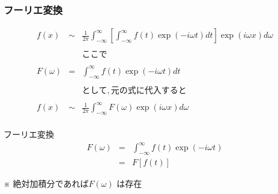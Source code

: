 \documentclass[a4paper]{jsarticle}
\begin{document}
\subsubsection{フーリエ変換}
\begin{eqnarray*}
    f\left(x\right) &\sim& \frac{1}{2\pi}\int^{\infty}_{-\infty}\left[\int^{\infty}_{-\infty}f\left(t\right)\exp \left(-i \omega t\right)dt\right] \exp \left(i\omega x\right) d\omega\\
    \\
    &&ここで\\
    \\
    F\left(\omega\right) &=& \int^{\infty}_{-\infty}f\left(t\right)\exp \left(-i \omega t\right)dt \\
    \\
    &&として,元の式に代入すると\\
    \\
    f\left(x\right) &\sim& \frac{1}{2\pi}\int^{\infty}_{-\infty} F\left(\omega\right) \exp \left(i\omega x\right) d\omega\\
\end{eqnarray*}
\begin{itembox}[l]{フーリエ変換}
    \begin{eqnarray*}
        F\left(\omega\right) &=& \int^\infty_{-\infty} f\left(t\right) \exp\left(-i\omega t\right)\\
        &=& F\left[f\left(t\right)\right]
    \end{eqnarray*}
    \begin{center}
        ※ 絶対加積分であれば$F\left(\omega\right)$ は存在
    \end{center}
\end{itembox}
\end{document}
